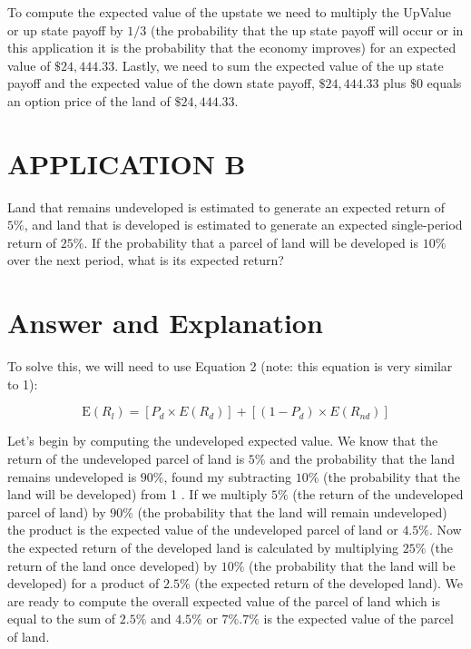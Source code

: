 \documentclass[11pt]{article}
\begin{document}
To compute the expected value of the upstate we need to multiply the UpValue or up state payoff by $1 / 3$ (the probability that the up state payoff will occur or in this application it is the probability that the economy improves) for an expected value of $\$ 24,444.33$. Lastly, we need to sum the expected value of the up state payoff and the expected value of the down state payoff, $\$ 24,444.33$ plus $\$ 0$ equals an option price of the land of $\$ 24,444.33$.

\section*{APPLICATION B}
Land that remains undeveloped is estimated to generate an expected return of $5 \%$, and land that is developed is estimated to generate an expected single-period return of $25 \%$. If the probability that a parcel of land will be developed is $10 \%$ over the next period, what is its expected return?

\section*{Answer and Explanation}
To solve this, we will need to use Equation 2 (note: this equation is very similar to 1):

$$
\mathrm{E}\left(R_{l}\right)=\left[P_{d} \times E\left(R_{d}\right)\right]+\left[\left(1-P_{d}\right) \times E\left(R_{n d}\right)\right]
$$

Let's begin by computing the undeveloped expected value. We know that the return of the undeveloped parcel of land is $5 \%$ and the probability that the land remains undeveloped is $90 \%$, found my subtracting $10 \%$ (the probability that the land will be developed) from 1 . If we multiply $5 \%$ (the return of the undeveloped parcel of land) by $90 \%$ (the probability that the land will remain undeveloped) the product is the expected value of the undeveloped parcel of land or $4.5 \%$. Now the expected return of the developed land is calculated by multiplying $25 \%$ (the return of the land once developed) by $10 \%$ (the probability that the land will be developed) for a product of $2.5 \%$ (the expected return of the developed land). We are ready to compute the overall expected value of the parcel of land which is equal to the sum of $2.5 \%$ and $4.5 \%$ or $7 \% .7 \%$ is the expected value of the parcel of land.
\end{document}
